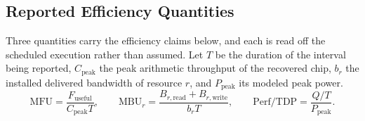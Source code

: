 
\subsection{Reported Efficiency Quantities}
\label{sec:reported_quantities}\label{app:reported_quantities}
Three quantities carry the efficiency claims below, and each is read off the scheduled execution rather than assumed.
Let $T$ be the duration of the interval being reported, $C_{\mathrm{peak}}$ the peak arithmetic throughput of the recovered chip, $b_r$ the installed delivered bandwidth of resource $r$, and $P_{\mathrm{peak}}$ its modeled peak power.
\begin{equation}
\mathrm{MFU}=\frac{F_{\mathrm{useful}}}{C_{\mathrm{peak}}T},
\qquad
\mathrm{MBU}_r=\frac{B_{r,\mathrm{read}}+B_{r,\mathrm{write}}}{b_rT},
\qquad
\mathrm{Perf}/\mathrm{TDP}=\frac{Q/T}{P_{\mathrm{peak}}}.
\label{eq:reported_quantities}
\end{equation}

